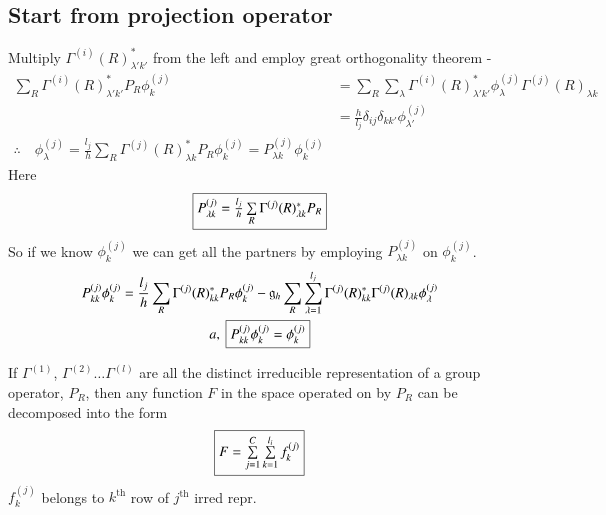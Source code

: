 \chapter[Lecture 9]{}\label{lec9}

\section*{Start from projection operator}

Multiply $\Gamma^{(i)}(R)^{*}_{\lambda'k'}$ from the left and employ great orthogonality theorem -
\begin{align*}
\sum\limits_{R}\Gamma^{(i)}(R)^{*}_{\lambda'k'}P_{R}\phi^{(j)}_{k} &= \sum\limits_{R}\sum\limits_{\lambda}\Gamma^{(i)}(R)^{*}_{\lambda'k'}\phi^{(j)}_{\lambda}\Gamma^{(j)}(R)_{\lambda k}\\
&= \frac{h}{l_{j}}\delta_{ij}\delta_{kk'}\phi^{(j)}_{\lambda'}\\
\therefore\quad \phi^{(j)}_{\lambda}=\frac{l_{j}}{h}\sum\limits_{R}\Gamma^{(j)}(R)^{*}_{\lambda k}P_{R}\phi^{(j)}_{k}=P^{(j)}_{\lambda k}\phi^{(j)}_{k}
\end{align*}
Here
$$
\fbox{$P^{(j)}_{\lambda k}=\frac{l_{j}}{h}\sum\limits_{R}\Gamma^{(j)}(R)^{*}_{\lambda k} P_{R}$}
$$
So if we know $\phi^{(j)}_{k}$ we can get all the partners by employing $P^{(j)}_{\lambda k}$ on $\phi^{(j)}_{k}$.
\begin{gather*}
P^{(j)}_{kk}\phi^{(j)}_{k}=\dfrac{l_{j}}{h}\sum\limits_{R}\Gamma^{(j)}(R)^{*}_{kk}P_{R}\phi^{(j)}_{k}-\mathfrak{g}_{h}\sum\limits_{R}\sum\limits^{l_{j}}_{\lambda=1}\Gamma^{(j)}(R)^{*}_{kk}\Gamma^{(j)}(R)_{\lambda k}\phi^{(j)}_{\lambda}\\
a, \ \fbox{$P^{(j)}_{kk}\phi^{(j)}_{k}=\phi^{(j)}_{k}$}
\end{gather*}

\begin{theorem*}
If $\Gamma^{(1)}$, $\Gamma^{(2)}\ldots \Gamma^{(l)}$ are all the distinct irreducible representation of a group operator, $P_{R}$, then any function $F$ in the space operated on by $P_{R}$ can be decomposed into the form
$$
\fbox{$F=\sum\limits^{C}_{j=1}\sum\limits^{l_{i}}_{k=1}f^{(j)}_{k}$}
$$
$f^{(j)}_{k}$ belongs to $k^{\text{th}}$ row of $j^{\text{th}}$ irred repr.
\end{theorem*}

